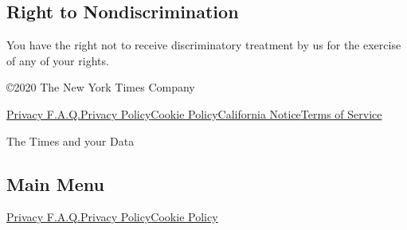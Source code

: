 \hypertarget{right-to-nondiscrimination}{%
\subsection{Right to
Nondiscrimination}\label{right-to-nondiscrimination}}

You have the right not to receive discriminatory treatment by us for the
exercise of any of your rights.

©2020 The New York Times Company

\href{/privacy}{Privacy F.A.Q.}\href{/privacy/privacy-policy}{Privacy
Policy}\href{/privacy/cookie-policy}{Cookie
Policy}\href{/privacy/california-notice}{California
Notice}\href{https://help.nytimes.com/hc/en-us/articles/115014893428-Terms-of-service}{Terms
of Service}

The Times and your Data

\hypertarget{main-menu}{%
\subsection{Main Menu}\label{main-menu}}

\href{/privacy}{Privacy F.A.Q.}\href{/privacy/privacy-policy}{Privacy
Policy}\href{/privacy/cookie-policy}{Cookie Policy}
